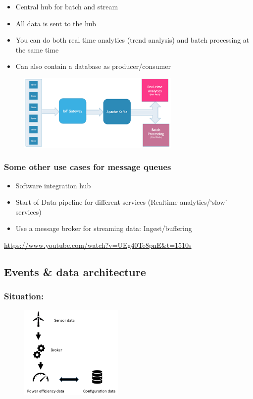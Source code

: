 \documentclass{article}
\begin{document}
\begin{itemize}
    \item Central hub for batch and stream
    \item All data is sent to the hub
    \item You can do both real time analytics (trend analysis) and batch processing at the same time
    \item Can also contain a database as producer/consumer
\end{itemize}

\begin{figure}[H]
    \centering
    \includegraphics[width=0.7\textwidth]{message-queue-analytics.png}
\end{figure}

\subsubsection{Some other use cases for message queues}

\begin{itemize}
    \item Software integration hub
    \item Start of Data pipeline for different services (Realtime analytics/`slow' services)
    \item Use a message broker for streaming data: Ingest/buffering
\end{itemize}

\url{https://www.youtube.com/watch?v=UEg40Te8pnE&t=1510s}

\subsection{Events \& data architecture}

\subsubsection{Situation:}

\begin{figure}[H]
    \centering
    \includegraphics[width=0.45\textwidth]{events-data-architecture-1.png}
\end{figure}
\end{document}

